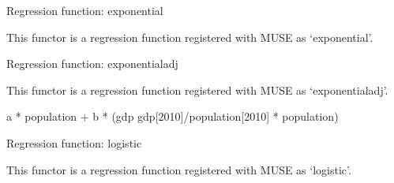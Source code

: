 \documentclass[letterpaper,10pt,english]{sphinxmanual}
\begin{document}
\begin{fulllineitems}
\label{\detokenize{api:muse.regressions.Exponential}}
Regression function: exponential

This functor is a regression function registered with MUSE as ‘exponential’.

\end{fulllineitems}


\begin{fulllineitems}
\label{\detokenize{api:muse.regressions.ExponentialAdj}}
Regression function: exponentialadj

This functor is a regression function registered with MUSE as ‘exponentialadj’.

\end{fulllineitems}


\begin{fulllineitems}
\label{\detokenize{api:muse.regressions.Linear}}
a * population + b * (gdp \sphinxhyphen{} gdp{[}2010{]}/population{[}2010{]} * population)

\end{fulllineitems}


\begin{fulllineitems}
\label{\detokenize{api:muse.regressions.Logistic}}
Regression function: logistic

This functor is a regression function registered with MUSE as ‘logistic’.

\end{fulllineitems}
\end{document}
